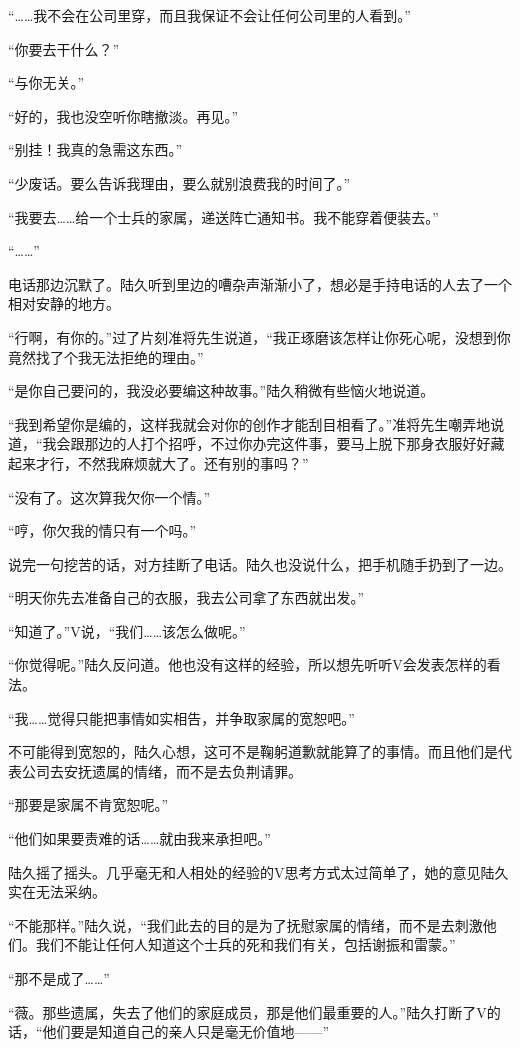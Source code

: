 “……我不会在公司里穿，而且我保证不会让任何公司里的人看到。”

“你要去干什么？”

“与你无关。”

“好的，我也没空听你瞎撤淡。再见。”

“别挂！我真的急需这东西。”

“少废话。要么告诉我理由，要么就别浪费我的时间了。”

“我要去……给一个士兵的家属，递送阵亡通知书。我不能穿着便装去。”

“……”

电话那边沉默了。陆久听到里边的嘈杂声渐渐小了，想必是手持电话的人去了一个相对安静的地方。

“行啊，有你的。”过了片刻准将先生说道，“我正琢磨该怎样让你死心呢，没想到你竟然找了个我无法拒绝的理由。”

“是你自己要问的，我没必要编这种故事。”陆久稍微有些恼火地说道。

“我到希望你是编的，这样我就会对你的创作才能刮目相看了。”准将先生嘲弄地说道，“我会跟那边的人打个招呼，不过你办完这件事，要马上脱下那身衣服好好藏起来才行，不然我麻烦就大了。还有别的事吗？”

“没有了。这次算我欠你一个情。”

“哼，你欠我的情只有一个吗。”

说完一句挖苦的话，对方挂断了电话。陆久也没说什么，把手机随手扔到了一边。

“明天你先去准备自己的衣服，我去公司拿了东西就出发。”

“知道了。”V说，“我们……该怎么做呢。”

“你觉得呢。”陆久反问道。他也没有这样的经验，所以想先听听V会发表怎样的看法。

“我……觉得只能把事情如实相告，并争取家属的宽恕吧。”

不可能得到宽恕的，陆久心想，这可不是鞠躬道歉就能算了的事情。而且他们是代表公司去安抚遗属的情绪，而不是去负荆请罪。

“那要是家属不肯宽恕呢。”

“他们如果要责难的话……就由我来承担吧。”

陆久摇了摇头。几乎毫无和人相处的经验的V思考方式太过简单了，她的意见陆久实在无法采纳。

“不能那样。”陆久说，“我们此去的目的是为了抚慰家属的情绪，而不是去刺激他们。我们不能让任何人知道这个士兵的死和我们有关，包括谢振和雷蒙。”

“那不是成了……”

“薇。那些遗属，失去了他们的家庭成员，那是他们最重要的人。”陆久打断了V的话，“他们要是知道自己的亲人只是毫无价值地——” 

